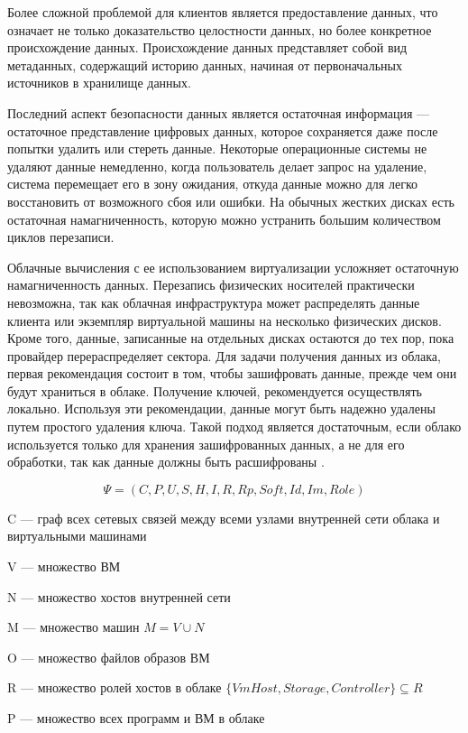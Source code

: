Более сложной проблемой для клиентов является предоставление данных, что означает не только доказательство целостности данных, но более конкретное происхождение данных.
Происхождение данных представляет собой вид метаданных, содержащий историю данных, начиная от первоначальных источников в хранилище данных.

Последний аспект безопасности данных является остаточная информация --- остаточное представление цифровых данных, которое сохраняется даже после попытки удалить или стереть данные.
Некоторые операционные системы не удаляют данные немедленно, когда пользователь делает запрос на удаление, система перемещает его в зону ожидания, откуда данные можно для легко восстановить от возможного сбоя или ошибки.
На обычных жестких дисках есть остаточная намагниченность, которую можно устранить большим количеством циклов перезаписи.

Облачные вычисления с ее использованием виртуализации усложняет остаточную намагниченность данных.
Перезапись физических носителей практически невозможна, так как облачная инфраструктура может распределять данные клиента или экземпляр виртуальной машины на несколько физических дисков.
Кроме того, данные, записанные на отдельных дисках остаются до тех пор, пока провайдер перераспределяет сектора.
Для задачи получения данных из облака, первая рекомендация состоит в том, чтобы зашифровать данные, прежде чем они будут храниться в облаке.
Получение ключей, рекомендуется осуществлять локально.
Используя эти рекомендации, данные могут быть надежно удалены путем простого удаления ключа.
Такой подход является достаточным, если облако используется только для хранения зашифрованных данных, а не для его обработки, так как данные должны быть расшифрованы \cite{zap}.

\iffalse
\begin{equation}
\Psi = (C, P, U, S, H, I, R, Rp, Soft, Id, Im, Role)
\end{equation}

C --- граф всех сетевых связей между всеми узлами внутренней сети облака и
виртуальными машинами

V --- множество ВМ

N --- множество хостов внутренней сети

M --- множество машин $M = V \cup N$

O --- множество файлов образов ВМ

R --- множество ролей хостов в облаке $\{VmHost, Storage, Controller\} \subseteq R$

P --- множество всех программ и ВМ в облаке

